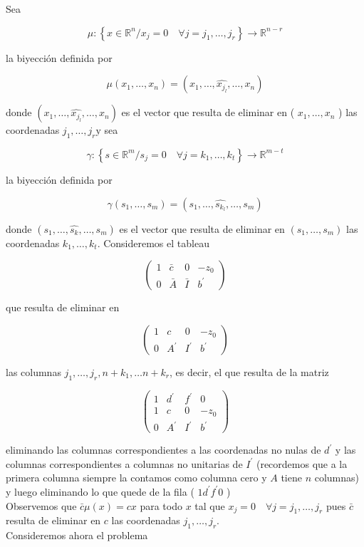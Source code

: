 \documentclass[10pt]{article}
\begin{document}
Sea

$$
\mu:\left\{x \in \mathbb{R}^{n} / x_{j}=0 \quad \forall j=j_{1}, \ldots, j_{r}\right\} \longrightarrow \mathbb{R}^{n-r}
$$

la biyección definida por

$$
\mu\left(x_{1}, \ldots, x_{n}\right)=\left(x_{1}, \ldots, \widehat{x_{j_{l}}}, \ldots, x_{n}\right)
$$

donde $\left(x_{1}, \ldots, \widehat{x_{j_{l}}}, \ldots, x_{n}\right)$ es el vector que resulta de eliminar en ( $x_{1}, \ldots, x_{n}$ ) las coordenadas $j_{1}, \ldots, j_{r} \mathrm{y}$ sea

$$
\gamma:\left\{s \in \mathbb{R}^{m} / s_{j}=0 \quad \forall j=k_{1}, \ldots, k_{t}\right\} \longrightarrow \mathbb{R}^{m-t}
$$

la biyección definida por

$$
\gamma\left(s_{1}, \ldots, s_{m}\right)=\left(s_{1}, \ldots, \widehat{s_{k_{l}}}, \ldots, s_{m}\right)
$$

donde $\left(s_{1}, \ldots, \widehat{s_{k}}, \ldots, s_{m}\right)$ es el vector que resulta de eliminar en $\left(s_{1}, \ldots, s_{m}\right)$ las coordenadas $k_{1}, \ldots, k_{t}$. Consideremos el tableau

$$
\left(\begin{array}{ccc|c}
1 & \bar{c} & 0 & -z_{0} \\
0 & \bar{A} & \bar{I} & b^{\prime}
\end{array}\right)
$$

que resulta de eliminar en

$$
\left(\begin{array}{ccc|c}
1 & c & 0 & -z_{0} \\
0 & A^{\prime} & I^{\prime} & b^{\prime}
\end{array}\right)
$$

las columnas $j_{1}, \ldots, j_{r}, n+k_{1}, \ldots n+k_{r}$, es decir, el que resulta de la matriz

$$
\left(\begin{array}{ccc|c}
1 & d^{\prime} & f^{\prime} & 0 \\
1 & c & 0 & -z_{0} \\
0 & A^{\prime} & I^{\prime} & b^{\prime}
\end{array}\right)
$$

eliminando las columnas correspondientes a las coordenadas no nulas de $d^{\prime}$ y las columnas correspondientes a columnas no unitarias de $I^{\prime}$ (recordemos que a la primera columna siempre la contamos como columna cero y $A$ tiene $n$ columnas) y luego eliminando lo que quede de la fila ( $1 d^{\prime} f^{\prime} 0$ )\\
Observemos que $\bar{c} \mu(x)=c x$ para todo $x$ tal que $x_{j}=0 \quad \forall j=j_{1}, \ldots, j_{r}$ pues $\bar{c}$ resulta de eliminar en $c$ las coordenadas $j_{1}, \ldots, j_{r}$.\\
Consideremos ahora el problema
\end{document}
